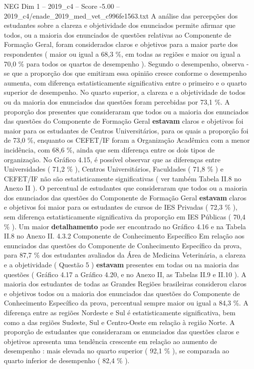 \begin{textsample}{NEG Dim 1 – 2019\_c4 – Score -5.00 – 2019\_c4/enade\_2019\_med\_vet\_c996fe1563.txt}
A análise das percepções dos estudantes sobre a clareza e objetividade dos enunciados permite afirmar que todos, ou a maioria dos enunciados de questões relativas ao Componente de Formação Geral, foram considerados claros e objetivos para a maior parte dos respondentes ( maior ou igual a 68,3 \%, em todas as regiões e maior ou igual a 70,0 \% para todos os quartos de desempenho ).
Segundo o desempenho, observa -se que a proporção dos que emitiram essa opinião cresce conforme o desempenho aumenta, com diferença estatisticamente significativa entre o primeiro e o quarto superior de desempenho.
No quarto superior, a clareza e a objetividade de todos ou da maioria dos enunciados das questões foram percebidas por 73,1 \%.
A proporção dos presentes que consideraram que todos ou a maioria dos enunciados das questões do Componente de Formação Geral \textbf{estavam} claros e objetivos foi maior para os estudantes de Centros Universitários, para os quais a proporção foi de 73,0 \%, enquanto os CEFET/IF foram a Organização Acadêmica com a menor incidência, com 68,6 \%, ainda que sem diferença entre os dois tipos de organização.
No Gráfico 4.15, é possível observar que as diferenças entre Universidades ( 71,2 \% ), Centros Universitários, Faculdades ( 71,8 \% ) e CEFET/IF não são estatisticamente significativas ( ver também Tabela II.8 no Anexo II ).
O percentual de estudantes que consideraram que todos ou a maioria dos enunciados das questões do Componente de Formação Geral \textbf{estavam} claros e objetivos foi maior para os estudantes de cursos de IES Privadas ( 72,3 \% ), sem diferença estatisticamente significativa da proporção em IES Públicas ( 70,4 \% ).
Um maior \textbf{detalhamento} pode ser encontrado no Gráfico 4.16 e na Tabela II.8 no Anexo II. 4.3.2 Componente de Conhecimento Específico Em relação aos enunciados das questões do Componente de Conhecimento Específico da prova, para 87,7 \% dos estudantes avaliados da Área de Medicina Veterinária, a clareza e a objetividade ( Questão 5 ) \textbf{estavam} presentes em todas ou na maioria das questões ( Gráfico 4.17 a Gráfico 4.20, e no Anexo II, as Tabelas II.9 e II.10 ).
A maioria dos estudantes de todas as Grandes Regiões brasileiras considerou claros e objetivos todos ou a maioria dos enunciados das questões do Componente de Conhecimento Específico da prova, percentual sempre maior ou igual a 84,3 \%.
A diferença entre as regiões Nordeste e Sul é estatisticamente significativa, bem como a das regiões Sudeste, Sul e Centro-Oeste em relação à região Norte.
A proporção de estudantes que consideraram os enunciados das questões claros e objetivos apresenta uma tendência crescente em relação ao aumento de desempenho : mais elevada no quarto superior ( 92,1 \% ), se comparada ao quarto inferior de desempenho ( 82,4 \% ).

\end{textsample}
